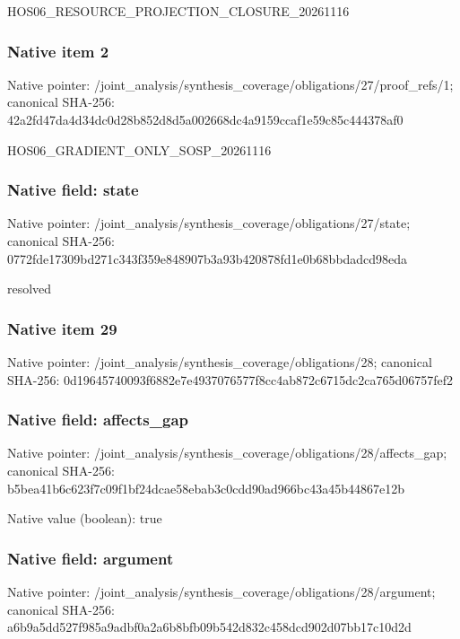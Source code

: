 \documentclass[10pt,a4paper]{article}
\begin{document}
\begingroup\raggedright\sloppy HOS06\_\allowbreak{}RESOURCE\_\allowbreak{}PROJECTION\_\allowbreak{}CLOSURE\_\allowbreak{}20261116\par\endgroup

\subsubsection{Native item 2}
Native pointer: /joint\_\allowbreak{}analysis/synthesis\_\allowbreak{}coverage/obligations/27/proof\_\allowbreak{}refs/1; canonical SHA-256: 42a2fd47da4d34dc0d28b852d8d5a002668dc4a9159ccaf1e59c85c444378af0

\begingroup\raggedright\sloppy HOS06\_\allowbreak{}GRADIENT\_\allowbreak{}ONLY\_\allowbreak{}SOSP\_\allowbreak{}20261116\par\endgroup

\subsubsection{Native field: state}
Native pointer: /joint\_\allowbreak{}analysis/synthesis\_\allowbreak{}coverage/obligations/27/state; canonical SHA-256: 0772fde17309bd271c343f359e848907b3a93b420878fd1e0b68bbdadcd98eda

\begingroup\raggedright\sloppy resolved\par\endgroup

\subsubsection{Native item 29}
Native pointer: /joint\_\allowbreak{}analysis/synthesis\_\allowbreak{}coverage/obligations/28; canonical SHA-256: 0d19645740093f6882e7e4937076577f8cc4ab872c6715dc2ca765d06757fef2

\subsubsection{Native field: affects\_\allowbreak{}gap}
Native pointer: /joint\_\allowbreak{}analysis/synthesis\_\allowbreak{}coverage/obligations/28/affects\_\allowbreak{}gap; canonical SHA-256: b5bea41b6c623f7c09f1bf24dcae58ebab3c0cdd90ad966bc43a45b44867e12b

Native value (boolean): true

\subsubsection{Native field: argument}
Native pointer: /joint\_\allowbreak{}analysis/synthesis\_\allowbreak{}coverage/obligations/28/argument; canonical SHA-256: a6b9a5dd527f985a9adbf0a2a6b8bfb09b542d832c458dcd902d07bb17c10d2d
\end{document}
